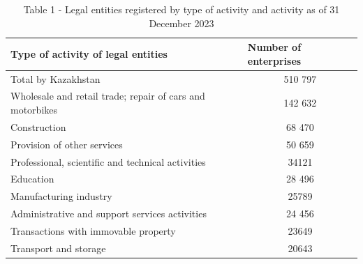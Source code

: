 \begin{table}[H]
\caption*{Table 1 - Legal entities registered by type of activity and activity as of 31 December 2023}
\centering
\begin{tabular}{|lc|}
\hline
\multicolumn{1}{|p{0.7\textwidth}|}{Type of activity of legal entities}                                                       & \multicolumn{1}{l|}{Number of enterprises} \\ \hline
\multicolumn{1}{|p{0.7\textwidth}|}{Total by Kazakhstan}                                                                        & 510 797                                  \\ \hline
\multicolumn{1}{|p{0.7\textwidth}|}{Wholesale and retail trade; repair of cars and motorbikes}                                & 142 632                                  \\ \hline
\multicolumn{1}{|p{0.7\textwidth}|}{Construction}                                                                             & 68 470                                   \\ \hline
\multicolumn{1}{|p{0.7\textwidth}|}{Provision of other services}                                                              & 50 659                                   \\ \hline
\multicolumn{1}{|p{0.7\textwidth}|}{Professional, scientific and technical activities}                                        & 34121                                    \\ \hline
\multicolumn{1}{|p{0.7\textwidth}|}{Education}                                                                                & 28 496                                   \\ \hline
\multicolumn{1}{|p{0.7\textwidth}|}{Manufacturing industry}                                                                   & 25789                                    \\ \hline
\multicolumn{1}{|p{0.7\textwidth}|}{Administrative and support services activities}                                           & 24 456                                   \\ \hline
\multicolumn{1}{|p{0.7\textwidth}|}{Transactions with immovable property}                                                     & 23649                                    \\ \hline
\multicolumn{1}{|p{0.7\textwidth}|}{Transport and storage}                                                                    & 20643                                    \\ \hline

\end{tabular}
\end{table}
